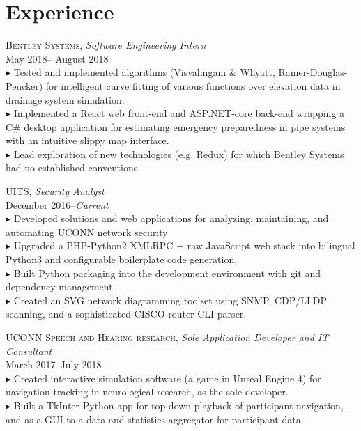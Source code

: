 \documentclass[Letterpaper,11pt]{article}
\newcommand{\bul}{$\blacktriangleright$ }
\begin{document}
\vspace{-1.5em} %
\section*{Experience}
\vspace{0.1em}

    \textsc{Bentley Systems},
    \textit{Software Engineering Intern}\\
    May 2018-- August 2018\\
        \bul Tested and implemented algorithms (Visvalingam \& Whyatt, Ramer-Douglas-Peucker) 
        for intelligent curve fitting of various functions over elevation data in 
        drainage system simulation.
        \\
        \bul Implemented a React web front-end and ASP.NET-core back-end wrapping a C\# desktop 
        application for estimating emergency preparedness in pipe systems with an intuitive 
        slippy map interface.
        \\
        \bul Lead exploration of new technologies (e.g. Redux) for which Bentley Systems
        had no established conventions.

    \textsc{UITS},
    \textit{Security Analyst}\\
    December 2016--\textit{Current}\\
        \bul Developed solutions and web applications for analyzing, maintaining, and automating UCONN network security
        \\
        \bul Upgraded a PHP-Python2 XMLRPC + raw JavaScript web stack into bilingual Python3 
        and configurable boilerplate code generation.
        \\
        \bul Built Python packaging into the development environment with git and 
        dependency management.
        \\
        \bul Created an SVG network diagramming toolset using SNMP, CDP/LLDP scanning, 
        and a sophisticated CISCO router CLI parser.

    \textsc{UCONN Speech and Hearing research},
    \textit{Sole Application Developer and IT Consultant}\\
    March 2017--July 2018\\
        \bul Created interactive simulation software (a game in Unreal Engine 4) 
        for navigation tracking in neurological research, as the sole developer.
        \\
        \bul Built a TkInter Python app for top-down playback of participant navigation,
        and as a GUI to a data and statistics aggregator for participant data..
        
\end{document}
